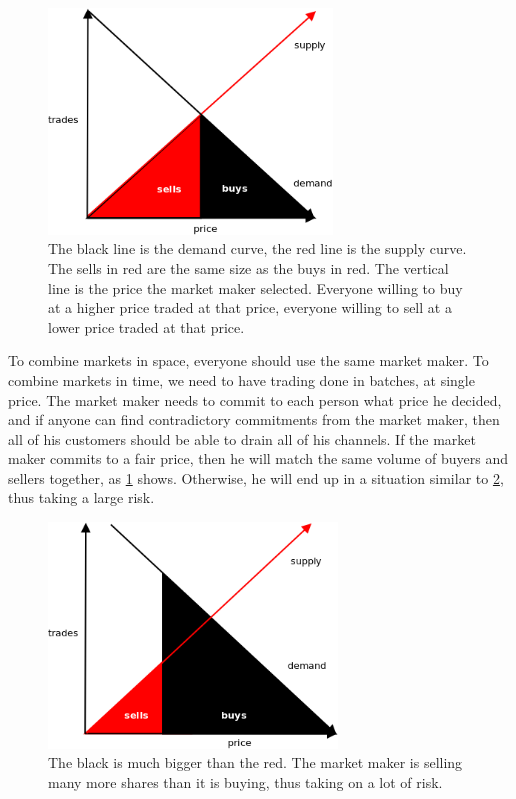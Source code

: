 \documentclass[a4paper, 10pt, conference]{ieeeconf}      %
\begin{document}
\begin{sketch}
\begin{draft}
\begin{figure}[htpb]
    \centering
    \includegraphics[width=\textwidth,height=6cm,keepaspectratio=true]{img/batch_channel.png}
    \caption{The black line is the demand curve, the red line is the supply curve. The sells in red are the same size as the buys in red. The vertical line is the price the market maker selected. Everyone willing to buy at a higher price traded at that price, everyone willing to sell at a lower price traded at that price.}
    \label{fig:batch_balanced}
\end{figure}

To combine markets in space, everyone should use the same market maker.
To combine markets in time, we need to have trading done in batches, at single price.
The market maker needs to commit to each person what price he decided, and if anyone can find contradictory commitments from the market maker, then all of his customers should be able to drain all of his channels.
If the market maker commits to a fair price, then he will match the same volume of buyers and sellers together, as \cref{fig:batch_balanced} shows. Otherwise, he will end up in a situation similar to \cref{fig:batch_unbalanced}, thus taking a large risk.

\begin{figure}[htpb]
    \centering
    \includegraphics[width=\textwidth,height=6cm,keepaspectratio=true]{img/batch_channel_unbalanced.png}
    \caption{The black is much bigger than the red. The market maker is selling many more shares than it is buying, thus taking on a lot of risk.}
    \label{fig:batch_unbalanced}
\end{figure}



\end{draft}
\end{sketch}
\end{document}
